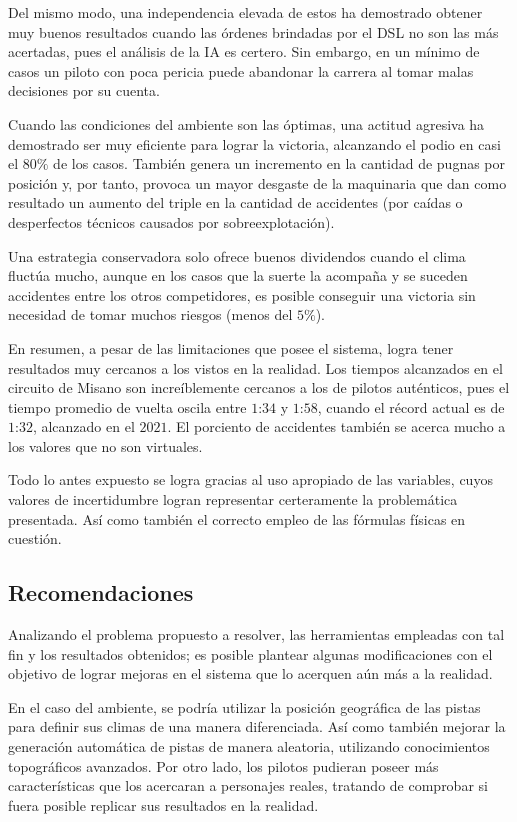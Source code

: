 \documentclass[12pt, letterpaper,spanish]{article}
\theoremstyle{definition}
\theoremstyle{remark}
\begin{document}
	Del mismo modo, una independencia elevada de estos ha demostrado obtener muy buenos resultados cuando las órdenes brindadas por el DSL no son las más acertadas, pues el análisis de la IA es certero. Sin embargo, en un mínimo de casos un piloto con poca pericia puede abandonar la carrera al tomar malas decisiones por su cuenta.

	Cuando las condiciones del ambiente son las óptimas, una actitud agresiva ha demostrado ser muy eficiente para lograr la victoria, alcanzando el podio en casi el $80\%$ de los casos. También genera un incremento en la cantidad de pugnas por posición y, por tanto, provoca un mayor desgaste de la maquinaria que dan como resultado un aumento del triple en la cantidad de accidentes (por caídas o desperfectos técnicos causados por sobreexplotación). 

	Una estrategia conservadora solo ofrece buenos dividendos cuando el clima fluctúa mucho, aunque en los casos que la suerte la acompaña y se suceden accidentes entre los otros competidores, es posible conseguir una victoria sin necesidad de tomar muchos riesgos (menos del $5\%$).

	En resumen, a pesar de las limitaciones que posee el sistema, logra tener resultados muy cercanos a los vistos en la realidad. Los tiempos alcanzados en el circuito de Misano son increíblemente cercanos a los de pilotos auténticos, pues el tiempo promedio de vuelta oscila entre $1$:$34$ y $1$:$58$, cuando el récord actual es de $1$:$32$, alcanzado en el $2021$. El porciento de accidentes también se acerca mucho a los valores que no son virtuales. 

	Todo lo antes expuesto se logra gracias al uso apropiado de las variables, cuyos valores de incertidumbre logran representar certeramente la problemática presentada. Así como también el correcto empleo de las fórmulas físicas en cuestión. 

	\subsection{Recomendaciones}
	Analizando el problema propuesto a resolver, las herramientas empleadas con tal fin y los resultados obtenidos; es posible plantear algunas modificaciones con el objetivo de lograr mejoras en el sistema que lo acerquen aún más a la realidad.

	En el caso del ambiente, se podría utilizar la posición geográfica de las pistas para definir sus climas de una manera diferenciada. Así como también mejorar la generación automática de pistas de manera aleatoria, utilizando conocimientos topográficos avanzados. Por otro lado, los pilotos pudieran poseer más características que los acercaran a personajes reales, tratando de comprobar si fuera posible replicar sus resultados en la realidad.
\end{document}
